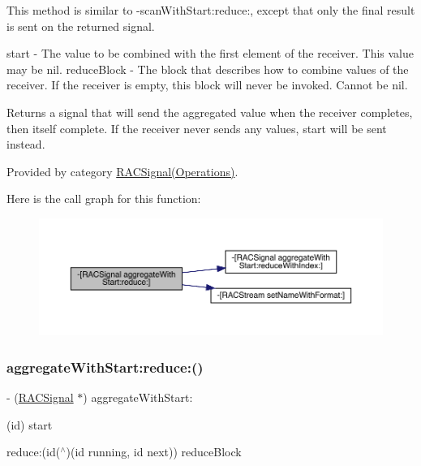 This method is similar to -\/scan\+With\+Start\+:reduce\+:, except that only the final result is sent on the returned signal.

start -\/ The value to be combined with the first element of the receiver. This value may be {\ttfamily nil}. reduce\+Block -\/ The block that describes how to combine values of the receiver. If the receiver is empty, this block will never be invoked. Cannot be nil.

Returns a signal that will send the aggregated value when the receiver completes, then itself complete. If the receiver never sends any values, {\ttfamily start} will be sent instead. 

Provided by category \mbox{\hyperlink{category_r_a_c_signal_07_operations_08_a4b872b6c2322aa37f98282043e768582}{R\+A\+C\+Signal(\+Operations)}}.

Here is the call graph for this function\+:\nopagebreak
\begin{figure}[H]
\begin{center}
\leavevmode
\includegraphics[width=350pt]{interface_r_a_c_signal_a4b872b6c2322aa37f98282043e768582_cgraph}
\end{center}
\end{figure}
\mbox{\label{interface_r_a_c_signal_a4b872b6c2322aa37f98282043e768582}} 
\subsubsection{\texorpdfstring{aggregate\+With\+Start\+:reduce\+:()}{aggregateWithStart:reduce:()}\hspace{0.1cm}{\footnotesize\ttfamily [2/3]}}
{\footnotesize\ttfamily -\/ (\mbox{\hyperlink{interface_r_a_c_signal}{R\+A\+C\+Signal}} $\ast$) aggregate\+With\+Start\+: \begin{DoxyParamCaption}\item[{(id)}]{start }\item[{reduce:(id($^\wedge$)(id running, id next))}]{reduce\+Block }\end{DoxyParamCaption}}

